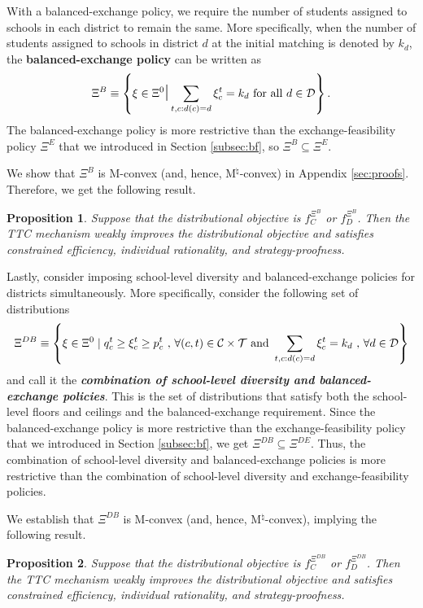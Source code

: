 \documentclass[12pt]{amsart}
\newtheorem{proposition}{Proposition}
\theoremstyle{remark}
\newcommand{\df}[1]{\textbf{\textit{#1}}}
\begin{document}
With a balanced-exchange policy, we require the
number of students assigned to schools in each district to remain the same. More specifically, when the number of students assigned to schools in district $d$ at the initial matching is denoted by $k_{d}$,  the \textbf{balanced-exchange policy} can be written as
\[\Xi^{B} \equiv \left \{\xi \in \Xi^0 \mathlarger{\mathlarger{\mid}} \sum_{t,c:d(c)=d} \xi_c^t = k_{d} \text{ for all } d \in \cald \right \}.\]
The balanced-exchange policy is more restrictive than the exchange-feasibility policy $\Xi^E$ that we introduced in
Section \ref{subsec:bf}, so  $\Xi^{B} \subseteq \Xi^E$.

We show that $\Xi^{B}$ is M-convex (and, hence, M$^ {\natural}$-convex) in Appendix \ref{sec:proofs}.  Therefore, we get the following result.

\begin{proposition}\label{prop:bal-ex}
Suppose that the distributional objective is $f_C^{\Xi^{B}}$ or $f_D^{\Xi^B}$. Then the TTC mechanism weakly improves the distributional objective and satisfies constrained efficiency, individual rationality, and strategy-proofness.
\end{proposition}


Lastly, consider imposing school-level diversity and balanced-exchange policies for districts simultaneously.
More specifically, consider the following set of distributions
\[\Xi^{DB} \equiv \left \{\xi\in \Xi^0 \mid q_c^t \geq \xi_c^t \geq p_c^t \text{ , } \forall (c,t)\in \mathcal{C} \times \mathcal{T} \text{ and }
  \sum_{t,c:d(c) = d} \xi_c^t = k_{d} \text{ , } \forall d \in \mathcal{D}\right \}\]
and call it the \df{combination of school-level diversity and balanced-exchange policies}. This is the set of distributions that satisfy both the school-level floors and ceilings and the balanced-exchange requirement. Since the balanced-exchange policy is more restrictive than the exchange-feasibility policy that we introduced
in Section \ref{subsec:bf}, we get $\Xi^{DB} \subseteq \Xi^{DE}$. Thus, the combination of school-level diversity and balanced-exchange policies is
more restrictive than the combination of school-level diversity and exchange-feasibility policies.

We establish that $\Xi^{DB}$ is M-convex (and, hence, M$^ {\natural}$-convex), implying the following result.

\begin{proposition}\label{prop:bal-mix}
Suppose that the distributional objective is $f_C^{\Xi^{DB}}$ or $f_D^{\Xi^{DB}}$. Then the TTC mechanism weakly improves the distributional objective and satisfies constrained efficiency, individual rationality, and strategy-proofness.
\end{proposition}
\end{document}
